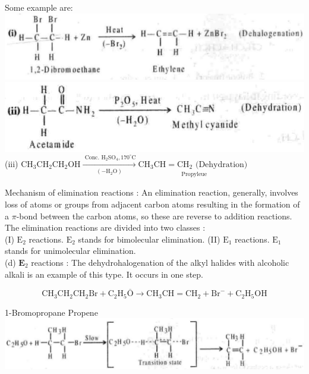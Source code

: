 \documentclass[10pt]{article}
\begin{document}
Some example are:\\
\includegraphics[max width=\textwidth, center]{2025_01_28_8470952b98110cec3aabg-099(3)}\\
\includegraphics[max width=\textwidth, center]{2025_01_28_8470952b98110cec3aabg-099(1)}\\
(iii) $\mathrm{CH}_{3} \mathrm{CH}_{2} \mathrm{CH}_{2} \mathrm{OH} \xrightarrow[\left(-\mathrm{H}_{2} \mathrm{O}\right)]{\text { Conc. } \mathrm{H}_{2} \mathrm{SO}_{4}, 170^{\circ} \mathrm{C}} \underset{\substack{\text { Propyleue }}}{\mathrm{CH}_{3} \mathrm{CH}=\mathrm{CH}_{2} \text { (Dehydration) }}$

Mechanism of elimination reactions : An elimination reaction, generally, involves loss of atoms or groups from adjacent carbon atoms resulting in the formation of a $\pi$-bond between the carbon atoms, so these are reverse to addition reactions. The elimination reactions are divided into two classes :\\
(I) $\mathrm{E}_{2}$ reactions. $\mathrm{E}_{2}$ stands for bimolecular elimination. (II) $\mathrm{E}_{1}$ reactions. $\mathrm{E}_{1}$ stands for unimolecular elimination.\\
(d) $\mathbf{E}_{2}$ reactions : The dehydrohalogenation of the alkyl halides with alcoholic alkali is an example of this type. It occurs in one step.

$$
\mathrm{CH}_{3} \mathrm{CH}_{2} \mathrm{CH}_{2} \mathrm{Br}+\mathrm{C}_{2} \mathrm{H}_{5} \overline{\mathrm{O}} \rightarrow \mathrm{CH}_{3} \mathrm{CH}=\mathrm{CH}_{2}+\mathrm{Br}^{-}+\mathrm{C}_{2} \mathrm{H}_{5} \mathrm{OH}
$$

1-Bromopropane Propene\\
\includegraphics[max width=\textwidth, center]{2025_01_28_8470952b98110cec3aabg-099(4)}
\end{document}

